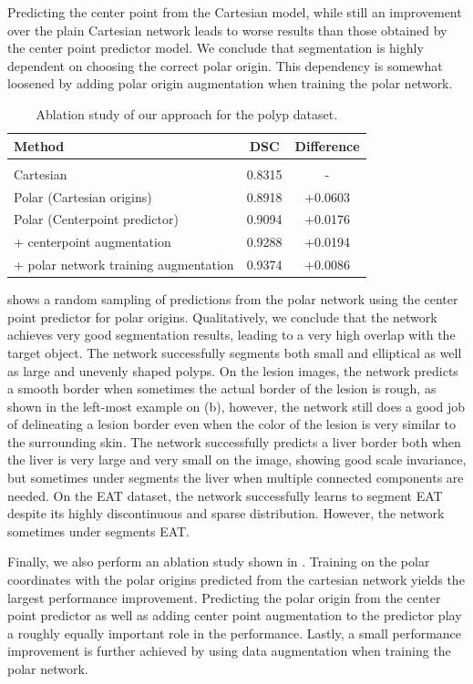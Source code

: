 Predicting the center point from the Cartesian model, while still an improvement over the plain 
Cartesian network leads to worse results than those obtained by the center point predictor model. 
We conclude that segmentation is highly dependent on choosing the correct polar origin. This 
dependency is somewhat loosened by adding polar origin augmentation when training the polar 
network.

	\begin{table}[t]
\centering
\def\arraystretch{1.2}
\begin{tabularx}{\linewidth}{X c c}
 Method & DSC & Difference \\ 
 \hline \\ [-2ex]
Cartesian & 0.8315 & - \\
Polar (Cartesian origins) & 0.8918  & +0.0603 \\
Polar (Centerpoint predictor) & 0.9094 & +0.0176  \\
 + centerpoint augmentation & 0.9288 & +0.0194 \\
 + polar network training augmentation & 0.9374 & +0.0086 \\ [1ex]
\end{tabularx}
\caption{Ablation study of our approach for the polyp dataset.}
\label{table:ablation}
\end{table}

 shows a random sampling of predictions from the polar network using the center point predictor for polar origins. Qualitatively, we conclude that the network achieves very good segmentation results, leading to a very high overlap with the target object. The network successfully segments both small and elliptical as well as large and unevenly shaped polyps. On the lesion images, the network predicts a smooth border when sometimes the actual border of the lesion is rough, as shown in the left-most example on (b), however, the network still does a good job of delineating a lesion border even when the color of the lesion is very similar to the surrounding skin. The network successfully predicts a liver border both when the liver is very large and very small on the image, showing good scale invariance, but sometimes under segments the liver when multiple connected components are needed. On the EAT dataset, the network successfully learns to segment EAT despite its highly discontinuous and sparse distribution. However, the network sometimes under segments EAT.

Finally, we also perform an ablation study shown in . Training on the polar coordinates with the polar origins predicted from the cartesian network yields the largest performance improvement. Predicting the polar origin from the center point predictor as well as adding center point augmentation to the predictor play a roughly equally important role in the performance. Lastly, a small performance improvement is further achieved by using data augmentation when training the polar network.

